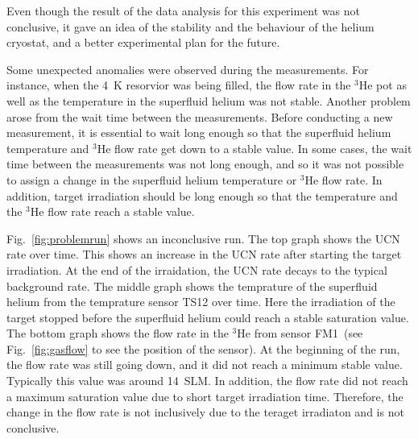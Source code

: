 Even though the result of the data analysis for this experiment was
not conclusive, it gave an idea of the stability and the behaviour of
the helium cryostat, and a better experimental plan for the future.

Some unexpected anomalies were observed during the measurements. For
instance, when the 4~K resorvior was being filled, the flow rate in
the $^3$He pot as well as the temperature in the superfluid helium was
not stable. Another problem arose from the wait time between the
measurements. Before conducting a new measurement, it is essential to
wait long enough so that the superfluid helium temperature and $^3$He
flow rate get down to a stable value. In some cases, the wait time
between the measurements was not long enough, and so it was not
possible to assign a change in the superfluid helium temperature or
$^3$He flow rate. In addition, target irradiation should be long
enough so that the temperature and the $^3$He flow rate reach a stable
value.

Fig.~\ref{fig:problemrun} shows an inconclusive run. The top graph
shows the UCN rate over time. This shows an increase in the UCN rate
after starting the target irradiation. At the end of the irraidation,
the UCN rate decays to the typical background rate. The middle graph
shows the temprature of the superfluid helium from the temprature
sensor TS12 over time. Here the irradiation of the target stopped
before the superfluid helium could reach a stable saturation
value. The bottom graph shows the flow rate in the $^3$He from sensor
FM1~(see Fig.~\ref{fig:gasflow} to see the position of the sensor). At
the beginning of the run, the flow rate was still going down, and it
did not reach a minimum stable value. Typically this value was around
14~SLM. In addition, the flow rate did not reach a maximum saturation
value due to short target irradiation time. Therefore, the change in
the flow rate is not inclusively due to the teraget irradiaton and is
not conclusive.




